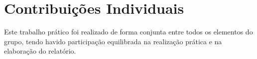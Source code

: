 \section{Contribuições Individuais}
Este trabalho prático foi realizado de forma conjunta entre todos os elementos do grupo, tendo havido
participação equilibrada na realização prática e na elaboração do relatório.